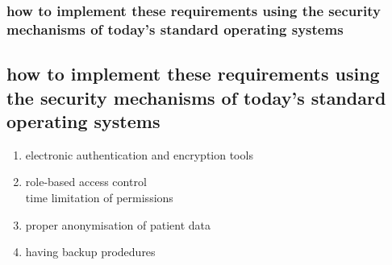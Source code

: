 \documentclass{beamer}
\begin{document}
\begin{frame}
    \frametitle{how to implement these requirements using the security mechanisms of today's standard operating systems}
    \subsection{how to implement these requirements using the security mechanisms of today's standard operating systems}
    \begin{enumerate}
        \item electronic authentication and encryption tools
        \item role-based access control \\
                time limitation of permissions
        \item proper anonymisation of patient data
        \item having backup prodedures 
    \end{enumerate}
\end{frame}
\end{document}
